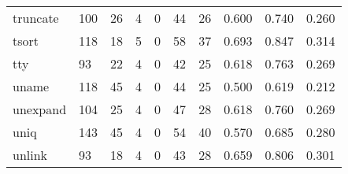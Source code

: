 \begin{longtable}{lp{2.0cm}p{2.0cm}p{2.0cm}p{2.0cm}p{2.0cm}p{2.0cm}p{2.0cm}p{2.0cm}p{2.0cm}}
truncate  &                    100 &                                 26 &                                 4 &                                0 &                                44 &                              26 &                                0.600 &                                  0.740 &                                0.260 \\
tsort     &                    118 &                                 18 &                                 5 &                                0 &                                58 &                              37 &                                0.693 &                                  0.847 &                                0.314 \\
tty       &                     93 &                                 22 &                                 4 &                                0 &                                42 &                              25 &                                0.618 &                                  0.763 &                                0.269 \\
uname     &                    118 &                                 45 &                                 4 &                                0 &                                44 &                              25 &                                0.500 &                                  0.619 &                                0.212 \\
unexpand  &                    104 &                                 25 &                                 4 &                                0 &                                47 &                              28 &                                0.618 &                                  0.760 &                                0.269 \\
uniq      &                    143 &                                 45 &                                 4 &                                0 &                                54 &                              40 &                                0.570 &                                  0.685 &                                0.280 \\
unlink    &                     93 &                                 18 &                                 4 &                                0 &                                43 &                              28 &                                0.659 &                                  0.806 &                                0.301 \\

\end{longtable}
